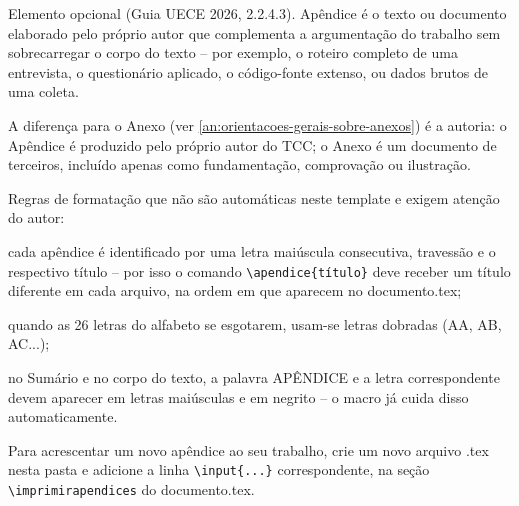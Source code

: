 \label{ap:orientacoes-gerais-sobre-apendices}

Elemento opcional (Guia UECE 2026, 2.2.4.3). Apêndice é o texto ou documento elaborado pelo próprio autor que complementa a argumentação do trabalho sem sobrecarregar o corpo do texto -- por exemplo, o roteiro completo de uma entrevista, o questionário aplicado, o código-fonte extenso, ou dados brutos de uma coleta.

A diferença para o Anexo (ver \autoref{an:orientacoes-gerais-sobre-anexos}) é a autoria: o Apêndice é produzido pelo próprio autor do TCC; o Anexo é um documento de terceiros, incluído apenas como fundamentação, comprovação ou ilustração.

Regras de formatação que não são automáticas neste template e exigem atenção do autor:

\begin{alineas}
	\item cada apêndice é identificado por uma letra maiúscula consecutiva, travessão e o respectivo título -- por isso o comando \texttt{\textbackslash apendice\{título\}} deve receber um título diferente em cada arquivo, na ordem em que aparecem no documento.tex;
	\item quando as 26 letras do alfabeto se esgotarem, usam-se letras dobradas (AA, AB, AC...);
	\item no Sumário e no corpo do texto, a palavra APÊNDICE e a letra correspondente devem aparecer em letras maiúsculas e em negrito -- o macro já cuida disso automaticamente.
\end{alineas}

Para acrescentar um novo apêndice ao seu trabalho, crie um novo arquivo .tex nesta pasta e adicione a linha \texttt{\textbackslash input\{...\}} correspondente, na seção \texttt{\textbackslash imprimirapendices} do documento.tex.
